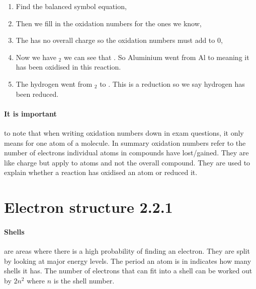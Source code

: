 	\begin{enumerate}
		\item Find the balanced symbol equation,
		
		
		\item Then we fill in the oxidation numbers for the ones we know,
		
		 
		\item The  has no overall charge so the oxidation numbers must add to 0,
		
		
		\item Now we have $_2$ we can see that . So Aluminium went from Al to  meaning it has been oxidised in this reaction.
		
		\item The hydrogen went from $_2$ to . This is a reduction so we say hydrogen has been reduced.
	\end{enumerate}
	\paragraph{It is important}to note that when writing oxidation numbers down in exam questions, it only means for one atom of a molecule.
    In summary oxidation numbers refer to the number of electrons individual atoms in compounds have lost/gained.
	They are like charge but apply to atoms and not the overall compound.
	They are used to explain whether a reaction has oxidised an atom or reduced it.
   \newpage
   \section{Electron structure 2.2.1}

	\paragraph{Shells} are areas where there is a high probability of finding an electron.
	They are split by looking at major energy levels.
	The period an atom is in indicates how many shells it has.
	The number of electrons that can fit into a shell can be worked out by $2n^2$ where $n$ is the shell number.
	
